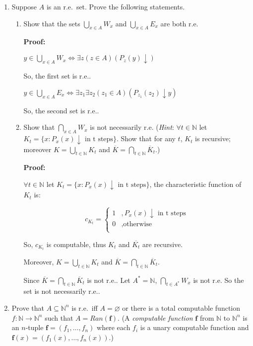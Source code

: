 \documentclass[12pt,a4paper]{article}
\theoremstyle{definition}
\numberwithin{equation}{section}
\numberwithin{figure}{section}
\begin{document}
\begin{enumerate}
\item Suppose $A$ is an r.e.~set. Prove the following statements.
\begin{enumerate}
\item Show that the sets $\bigcup\limits_{x\in A}W_x$ and $\bigcup\limits_{x\in A}E_x$ are both r.e.

\textbf{Proof:}

$y \in \bigcup\limits_{x\in A}W_x \Leftrightarrow \exists z(z \in A)(P_z(y) \downarrow)$

So, the first set is r.e..

$y \in \bigcup\limits_{x\in A}E_x \Leftrightarrow \exists z_1 \exists z_2(z_1 \in A)(P_{z_1}(z_2) \downarrow y)$

So, the second set is r.e..

\item Show that $\bigcap\limits_{x\in A}W_x$ is not necessarily r.e. (\emph{Hint}: $\forall t \in \mathbb{N}$ let $K_t=\{x:P_x(x)\downarrow \mbox{ in t steps}\}$. Show that for any $t$, $K_t$ is recursive; moreover $K=\bigcup\limits_{t\in\mathbb{N}}K_t$ and $\overline{K}=\bigcap\limits_{t\in\mathbb{N}}\overline{K}_t$.)

\textbf{Proof:}

$\forall t \in \mathbb{N}$ let $K_t=\{x:P_x(x)\downarrow \mbox{ in t steps}\}$, the characteristic function of $K_t$ is:

$$c_{K_t} = \begin{cases} 1 &, P_x(x)\downarrow \mbox{ in t steps} \\ 0 &, \mbox{otherwise} \\ \end{cases}$$

So, $c_{K_t}$ is computable, thus $K_t$ and $\overline{K_t}$ are recursive.

Moreover, $K=\bigcup\limits_{t\in\mathbb{N}}K_t$ and $\overline{K}=\bigcap\limits_{t\in\mathbb{N}}\overline{K}_t$.

Since $\overline{K}=\bigcap\limits_{t\in\mathbb{N}}\overline{K}_t$ is not r.e.. Let $A^* = \mathbb{N}$, $\bigcap\limits_{t\in A^*}W_x$ is not r.e. So the set is not necessarily r.e..

\end{enumerate}

\item Prove that $A\subseteq\mathbb{N}^n$ is r.e.~iff $A=\varnothing$ or there is a total computable function $f:\mathbb{N}\rightarrow\mathbb{N}^n$ such that $A=Ran(\bm{f})$. (A \emph{computable function} $\bm{f}$ from $\mathbb{N}$ to $\mathbb{N}^n$ is an $n$-tuple $\bm{f}=(f_1,\ldots,f_n)$ where each $f_i$ is a unary computable function and $\bm{f}(x)=(f_1(x),\ldots,f_n(x))$.)


\end{enumerate}
\end{document}
